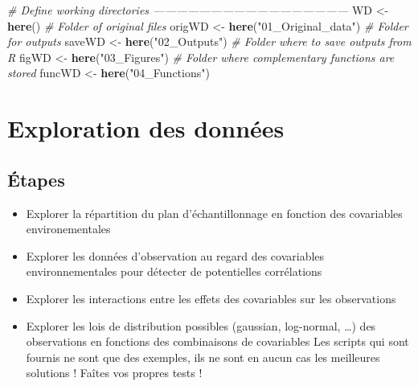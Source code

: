 \documentclass[french,a4paper]{article}
\newenvironment{Shaded}{\begin{snugshade}}{\end{snugshade}}
\newcommand{\CommentTok}[1]{\textcolor[rgb]{0.56,0.35,0.01}{\textit{#1}}}
\newcommand{\KeywordTok}[1]{\textcolor[rgb]{0.13,0.29,0.53}{\textbf{#1}}}
\newcommand{\NormalTok}[1]{#1}
\newcommand{\StringTok}[1]{\textcolor[rgb]{0.31,0.60,0.02}{#1}}
\providecommand{\tightlist}{%
  \setlength{\itemsep}{0pt}\setlength{\parskip}{0pt}}
\begin{document}
\begin{Shaded}
\begin{Highlighting}[]
\CommentTok{# Define working directories ---------------------------------------------------}
\NormalTok{WD <-}\StringTok{ }\KeywordTok{here}\NormalTok{()}
\CommentTok{# Folder of original files}
\NormalTok{origWD <-}\StringTok{ }\KeywordTok{here}\NormalTok{(}\StringTok{"01_Original_data"}\NormalTok{)}
\CommentTok{# Folder for outputs}
\NormalTok{saveWD <-}\StringTok{ }\KeywordTok{here}\NormalTok{(}\StringTok{"02_Outputs"}\NormalTok{)}
\CommentTok{# Folder where to save outputs from R}
\NormalTok{figWD <-}\StringTok{ }\KeywordTok{here}\NormalTok{(}\StringTok{"03_Figures"}\NormalTok{)}
\CommentTok{# Folder where complementary functions are stored}
\NormalTok{funcWD <-}\StringTok{ }\KeywordTok{here}\NormalTok{(}\StringTok{"04_Functions"}\NormalTok{)}
\end{Highlighting}
\end{Shaded}

\hypertarget{exploration-des-donnees-1}{%
\section{Exploration des données}\label{exploration-des-donnees-1}}

\hypertarget{etapes}{%
\subsection{Étapes}\label{etapes}}


\begin{itemize}
\tightlist
\item
  Explorer la répartition du plan d'échantillonnage en fonction des covariables environementales
\item
  Explorer les données d'observation au regard des covariables environnementales pour détecter de potentielles corrélations
\item
  Explorer les interactions entre les effets des covariables sur les observations
\item
  Explorer les lois de distribution possibles (gaussian, log-normal, \ldots) des observations en fonctions des combinaisons de covariables
  \nopandoc{\begin{redbox}}
  Les scripts qui sont fournis ne sont que des exemples, ils ne sont en aucun cas les meilleures solutions !
  Faîtes vos propres tests !
  \nopandoc{\end{redbox}}
\end{itemize}
\end{document}
